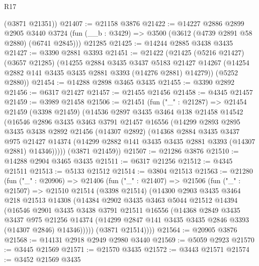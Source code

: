 \begin{lexlean}{R17}
\begin{coremodule}
      (@3871 @21351))
@21407 := @21158 @3876
@21422 := @14227
    @2886
    @2899
    @2905
    @3440
    @3724
    (fun (__b : @3429) => @3500 (@3612 (@4739 @2891 @58 @2880) (@6741 @2845)))
    @21285
@21425 := @14244 @2885 @3438 @3435
@21427 := @3390 @2881 @3393
@21451 := @21422
    (@21425
      (@5216 @21427)
      (@3657 @21285)
      (@14255
        @2884
        @3435
        @3437
        @5183
        @21427
        @14267
        (@14254 @2882 @141 @3435 @3435 @2881 @3393 (@14276 @2881) @14279))
      (@5252 @2880))
@21454 := @14288 @2898 @3465 @3435
@21455 := @3390 @2892
@21456 := @6317 @21427
@21457 := @21455 @21456
@21458 := @4345 @21457
@21459 := @3989 @21458
@21506 := @21451
    (fun ("_" : @21287) =>
    @21454
      @21459
      (@3398 @21459)
      (@14536
        @2897
        @3435
        @3464
        @138
        @21458
        @14542
        (@16546
          @2896
          @3435
          @3463
          @3791
          @21457
          @16556
          (@14299
            @2893
            @2895
            @3435
            @3438
            @2892
            @21456
            (@14307 @2892)
            (@14368
              @2884
              @3435
              @3437
              @975
              @21427
              @14374
              (@14299 @2882 @141 @3435 @3435 @2881 @3393 (@14307 @2881) @14346)))))
      (@3871 @21459))
@21507 := @21286 @3876
@21510 := @14288 @2904 @3465 @3435
@21511 := @6317 @21256
@21512 := @4345 @21511
@21513 := @5133 @21512
@21514 := @3804 @21513
@21563 := @21280
    (fun ("_" : @20906) =>
    @21406
      (fun ("_" : @21407) =>
      @21506
        (fun ("_" : @21507) =>
        @21510
          @21514
          (@3398 @21514)
          (@14300
            @2903
            @3435
            @3464
            @218
            @21513
            @14308
            (@14384
              @2902
              @3435
              @3463
              @5044
              @21512
              @14394
              (@16546
                @2901
                @3435
                @3438
                @3791
                @21511
                @16556
                (@14368
                  @2849
                  @3435
                  @3437
                  @975
                  @21256
                  @14374
                  (@14299 @2847 @141 @3435 @3435 @2846 @3393 (@14307 @2846) @14346)))))
          (@3871 @21514))))
@21564 := @20905 @3876
@21568 := @14131 @2918 @2949 @2980 @3440
@21569 := @5059 @2923
@21570 := @3445 @21569
@21571 := @21570 @3435
@21572 := @3443 @21571
@21574 := @3452 @21569 @3435

\end{coremodule}
\end{lexlean}
